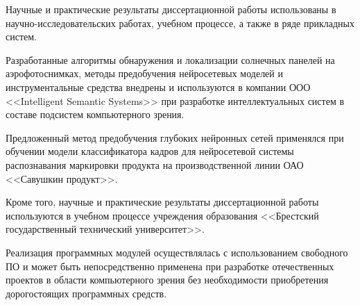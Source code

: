 
Научные и практические результаты диссертационной работы использованы в научно-исследовательских работах, учебном процессе, а также в ряде прикладных систем.

Разработанные алгоритмы обнаружения и локализации солнечных панелей на аэрофотоснимках, методы предобучения нейросетевых моделей и инструментальные средства внедрены и используются в компании ООО <<Intelligent Semantic Systems>> при разработке интеллектуальных систем в составе подсистем компьютерного зрения.

Предложенный метод предобучения глубоких нейронных сетей применялся при обучении модели классификатора кадров для нейросетевой системы распознавания маркировки продукта на производственной линии ОАО <<Савушкин продукт>>.

Кроме того, научные и практические результаты диссертационной работы используются в учебном процессе учреждения образования <<Брестский государственный технический университет>>.


Реализация программных модулей осуществлялась с использованием свободного ПО и может быть непосредственно применена при разработке отечественных проектов в области компьютерного зрения без необходимости приобретения дорогостоящих программных средств.

